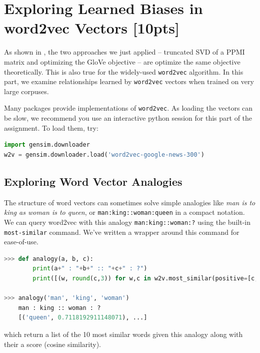 \documentclass[a4paper,10pt]{article}
\begin{document}
\section{Exploring Learned Biases in word2vec Vectors [10pts]}

As shown in \cite{levy2014neural,kenyon2020deconstructing}, the two approaches we just applied -- truncated SVD of a PPMI matrix and optimizing the GloVe objective -- are optimize the same objective theoretically. This is also true for the widely-used \texttt{word2vec} algorithm. In this part, we examine relationships learned by \texttt{word2vec} vectors when trained on very large corpuses.

Many packages provide implementations of \texttt{word2vec}. As loading the vectors can be slow, we recommend you use an interactive python session for this part of the assignment. To load them, try:
%
\begin{center}
\begin{minipage}{0.95\textwidth}
\begin{lstlisting}[language=Python]
import gensim.downloader
w2v = gensim.downloader.load('word2vec-google-news-300')
\end{lstlisting}
\end{minipage}
\end{center}
%


\subsection{Exploring Word Vector Analogies}
The structure of word vectors can sometimes solve simple analogies like \emph{man is to king as woman is to queen}, or \texttt{man:king::woman:queen} in a compact notation. We can query word2vec with this analogy \texttt{man:king::woman:?} using the built-in \texttt{most-similar} command. We've written a wrapper around this command for ease-of-use.
%
\begin{center}
\begin{minipage}{0.95\textwidth}
\begin{lstlisting}[language=Python]
>>> def analogy(a, b, c):
        print(a+" : "+b+" :: "+c+" : ?") 
        print([(w, round(c,3)) for w,c in w2v.most_similar(positive=[c,b], negative=[a])])
        
>>> analogy('man', 'king', 'woman')
    man : king :: woman : ?
    [('queen', 0.7118192911148071), ...]
\end{lstlisting}
\end{minipage}
\end{center}
%
which return a list of the 10 most similar words given this analogy along with their a score (cosine similarity). 
\end{document}
